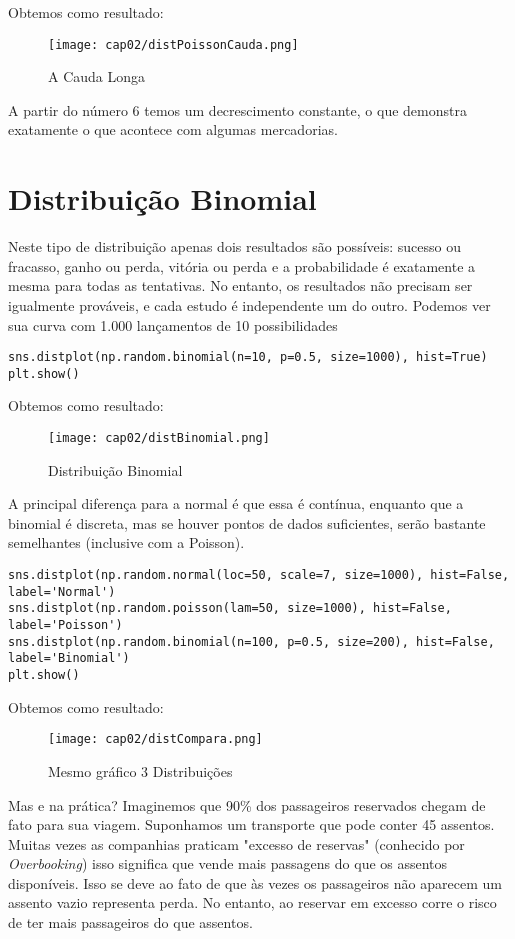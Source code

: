 Obtemos como resultado:
\begin{figure}[H]
	\centering
	\texttt{[image: cap02/distPoissonCauda.png]}
	\caption{A Cauda Longa}
\end{figure}

A partir do número 6 temos um decrescimento constante, o que demonstra exatamente o que acontece com algumas mercadorias.

\section{Distribuição Binomial}
Neste tipo de distribuição apenas dois resultados são possíveis: sucesso ou fracasso, ganho ou perda, vitória ou perda e a probabilidade é exatamente a mesma para todas as tentativas. No entanto, os resultados não precisam ser igualmente prováveis, e cada estudo é independente um do outro. Podemos ver sua curva com 1.000 lançamentos de 10 possibilidades
\begin{lstlisting}
sns.distplot(np.random.binomial(n=10, p=0.5, size=1000), hist=True)
plt.show()
\end{lstlisting}

Obtemos como resultado:
\begin{figure}[H]
	\centering
	\texttt{[image: cap02/distBinomial.png]}
	\caption{Distribuição Binomial}
\end{figure}

A principal diferença para a normal é que essa é contínua, enquanto que a binomial é discreta, mas se houver pontos de dados suficientes, serão bastante semelhantes (inclusive com a Poisson).

\begin{lstlisting}
sns.distplot(np.random.normal(loc=50, scale=7, size=1000), hist=False, label='Normal')
sns.distplot(np.random.poisson(lam=50, size=1000), hist=False, label='Poisson')
sns.distplot(np.random.binomial(n=100, p=0.5, size=200), hist=False, label='Binomial')
plt.show()
\end{lstlisting}

Obtemos como resultado:
\begin{figure}[H]
	\centering
	\texttt{[image: cap02/distCompara.png]}
	\caption{Mesmo gráfico 3 Distribuições}
\end{figure}

Mas e na prática? Imaginemos que 90\% dos passageiros reservados chegam de fato para sua viagem. Suponhamos um transporte que pode conter 45 assentos. Muitas vezes as companhias praticam "excesso de reservas" (conhecido por \textit{Overbooking}) isso significa que vende mais passagens do que os assentos disponíveis. Isso se deve ao fato de que às vezes os passageiros não aparecem um assento vazio representa perda. No entanto, ao reservar em excesso corre o risco de ter mais passageiros do que assentos.

